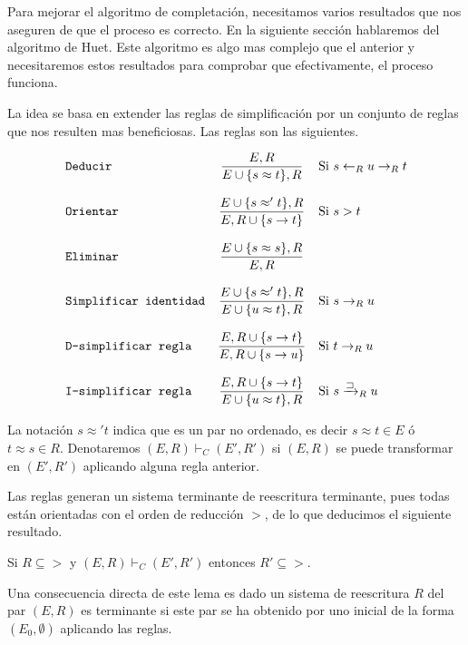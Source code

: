 Para mejorar el algoritmo de completación, necesitamos varios
resultados que nos aseguren de que el proceso es correcto. En la
siguiente sección hablaremos del algoritmo de Huet. Este algoritmo es
algo mas complejo que el anterior y necesitaremos estos resultados
para comprobar que efectivamente, el proceso funciona.

La idea se basa en extender las reglas de simplificación por un
conjunto de reglas que nos resulten mas beneficiosas. Las reglas son
las siguientes.

\[
  \begin{array}{lcl}
    $\texttt{Deducir} $ & \dfrac{E,R}{E \cup \{s \approx t \}, R} & $Si $ s \leftarrow_R u \rightarrow_R t \\ \\
    $\texttt{Orientar}$ & \dfrac{E \cup \{s \approx' t\},R}{E,R \cup \{s \rightarrow t\}} & $Si $ s > t \\ \\
    $\texttt{Eliminar}$ & \dfrac{E \cup \{s \approx s\}, R}{E,R} & \\ \\
    $\texttt{Simplificar identidad}$   & \dfrac{E \cup \{ s\approx' t\},R}{E \cup \{ u \approx t\},R} & $Si $ s \rightarrow_R u\\ \\
    $\texttt{D-simplificar regla}$    & \dfrac{E, R \cup \{s \rightarrow t \} }{E,R \cup \{s \rightarrow u\}} & $Si $ t \rightarrow_R u   \\ \\
    $\texttt{I-simplificar regla}$    & \dfrac{E, R \cup \{s \rightarrow t \} }{E \cup \{u \approx t \}, R} & $Si $ s \xrightarrow{\sqsupset}_R u
  \end{array} 
\]

La notación $s \approx' t$ indica que es un par no ordenado, es decir
$s \approx t \in E$ ó $t \approx s \in R$. Denotaremos
$(E,R) \vdash_C (E',R')$ si $(E,R)$ se puede transformar en $(E', R')$
aplicando alguna regla anterior.

Las reglas generan un sistema terminante de reescritura terminante,
pues todas están orientadas con el orden de reducción $>$, de lo que
deducimos el siguiente resultado.

\begin{lema}
 Si $R \subseteq >$ y $(E,R) \vdash_C (E',R')$ entonces $R' \subseteq >$.
\end{lema}

Una consecuencia directa de este lema es dado un sistema de
reescritura $R$ del par $(E,R)$ es terminante si este par se ha
obtenido por uno inicial de la forma $(E_0, \emptyset)$ aplicando las reglas.

